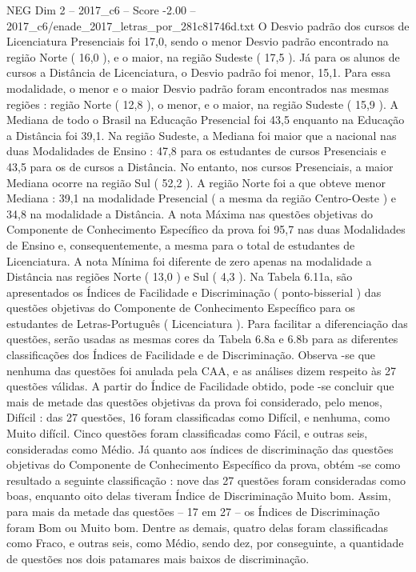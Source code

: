 \begin{textsample}{NEG Dim 2 – 2017\_c6 – Score -2.00 – 2017\_c6/enade\_2017\_letras\_por\_281c81746d.txt}
O Desvio padrão dos cursos de Licenciatura Presenciais foi 17,0, sendo o menor Desvio padrão encontrado na região Norte ( 16,0 ), e o maior, na região Sudeste ( 17,5 ).
Já para os alunos de cursos a Distância de Licenciatura, o Desvio padrão foi menor, 15,1.
Para essa modalidade, o menor e o maior Desvio padrão foram encontrados nas mesmas regiões : região Norte ( 12,8 ), o menor, e o maior, na região Sudeste ( 15,9 ).
A Mediana de todo o Brasil na Educação Presencial foi 43,5 enquanto na Educação a Distância foi 39,1.
Na região Sudeste, a Mediana foi maior que a nacional nas duas Modalidades de Ensino : 47,8 para os estudantes de cursos Presenciais e 43,5 para os de cursos a Distância.
No entanto, nos cursos Presenciais, a maior Mediana ocorre na região Sul ( 52,2 ).
A região Norte foi a que obteve menor Mediana : 39,1 na modalidade Presencial ( a mesma da região Centro-Oeste ) e 34,8 na modalidade a Distância.
A nota Máxima nas questões objetivas do Componente de Conhecimento Específico da prova foi 95,7 nas duas Modalidades de Ensino e, consequentemente, a mesma para o total de estudantes de Licenciatura.
A nota Mínima foi diferente de zero apenas na modalidade a Distância nas regiões Norte ( 13,0 ) e Sul ( 4,3 ).
Na Tabela 6.11a, são apresentados os Índices de Facilidade e Discriminação ( ponto-bisserial ) das questões objetivas do Componente de Conhecimento Específico para os estudantes de Letras-Português ( Licenciatura ).
Para facilitar a diferenciação das questões, serão usadas as mesmas cores da Tabela 6.8a e 6.8b para as diferentes classificações dos Índices de Facilidade e de Discriminação.
Observa -se que nenhuma das questões foi anulada pela CAA, e as análises dizem respeito às 27 questões válidas.
A partir do Índice de Facilidade obtido, pode -se concluir que mais de metade das questões objetivas da prova foi considerado, pelo menos, Difícil : das 27 questões, 16 foram classificadas como Difícil, e nenhuma, como Muito difícil.
Cinco questões foram classificadas como Fácil, e outras seis, consideradas como Médio.
Já quanto aos índices de discriminação das questões objetivas do Componente de Conhecimento Específico da prova, obtém -se como resultado a seguinte classificação : nove das 27 questões foram consideradas como boas, enquanto oito delas tiveram Índice de Discriminação Muito bom.
Assim, para mais da metade das questões – 17 em 27 – os Índices de Discriminação foram Bom ou Muito bom.
Dentre as demais, quatro delas foram classificadas como Fraco, e outras seis, como Médio, sendo dez, por conseguinte, a quantidade de questões nos dois patamares mais baixos de discriminação.

\end{textsample}
